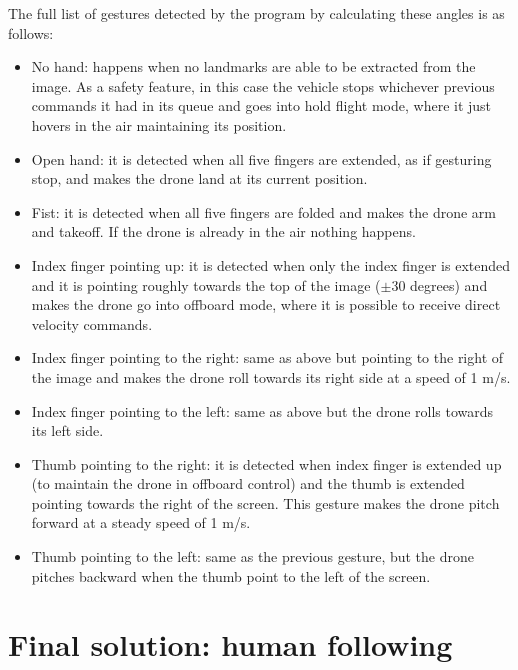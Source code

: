 The full list of gestures detected by the program by calculating these angles is as follows:
\begin{itemize}
    \item No hand: happens when no landmarks are able to be extracted from the image. As a safety feature, in this case the vehicle stops whichever previous commands it had in its queue and goes into hold flight mode, where it just hovers in the air maintaining its position.
    \item Open hand: it is detected when all five fingers are extended, as if gesturing stop, and makes the drone land at its current position.
    \item Fist: it is detected when all five fingers are folded and makes the drone arm and takeoff. If the drone is already in the air nothing happens.
    \item Index finger pointing up: it is detected when only the index finger is extended and it is pointing roughly towards the top of the image ($\pm 30$ degrees) and makes the drone go into offboard mode, where it is possible to receive direct velocity commands.
    \item Index finger pointing to the right: same as above but pointing to the right of the image and makes the drone roll towards its right side at a speed of 1 m/s.
    \item Index finger pointing to the left: same as above but the drone rolls towards its left side.
    \item Thumb pointing to the right: it is detected when index finger is extended up (to maintain the drone in offboard control) and the thumb is extended pointing towards the right of the screen. This gesture makes the drone pitch forward at a steady speed of 1 m/s.
    \item Thumb pointing to the left: same as the previous gesture, but the drone pitches backward when the thumb point to the left of the screen.
\end{itemize}



\section{Final solution: human following}
\label{sec:follow}


